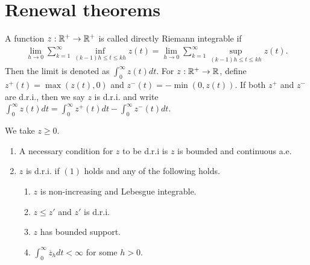 \documentclass[all-lectures.tex]{subfiles}
\begin{document}

\setcounter{section}{4}
\setcounter{subsection}{0}

\section*{} %
\section{Renewal theorems}
\begin{defn}
A function $z: \mathbb{R}^+ \rightarrow \mathbb{R}^+$ is called directly Riemann integrable if
\begin{align*}
\lim_{h\to 0} \sum_{k = 1}^\infty \inf_{(k-1)h \leq t \leq kh} z(t) = \lim_{h\to 0} \sum_{k = 1}^\infty \sup_{(k-1)h \leq t \leq kh} z(t). 
\end{align*}
Then the limit is denoted as $\int_0^\infty z(t)dt$. For $z: \mathbb{R}^+ \rightarrow \mathbb{R}$, define $z^+(t) = \max(z(t),0)$ and $z^-(t)= -\min(0,z(t))$. If both $z^+$ and $z^-$ are d.r.i., then we say $z$ is d.r.i. and write $\int_0^\infty z(t)dt = \int_0^\infty z^+(t)dt - \int_0^\infty z^-(t)dt$.
\end{defn}

\begin{prop} We take $z\geq 0$.
\begin{enumerate}[label=(\arabic*)]
\item A necessary condition for $z$ to be d.r.i  is $z$ is bounded and continuous a.e.
\item $z$ is d.r.i. if $(1)$ holds and any of the following holds.
\begin{enumerate}
\item $z$ is non-increasing and Lebesgue integrable. 
\item $z\leq z'$ and $z'$ is d.r.i.
\item $z$ has bounded support.
\item $\int_0^\infty \overline{z}_h dt < \infty$ for some $h>0$.
\end{enumerate}
\end{enumerate}
\end{prop}
\end{document}
